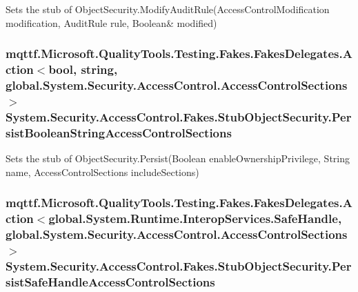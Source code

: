 Sets the stub of Object\-Security.\-Modify\-Audit\-Rule(Access\-Control\-Modification modification, Audit\-Rule rule, Boolean\& modified)

\hypertarget{class_system_1_1_security_1_1_access_control_1_1_fakes_1_1_stub_object_security_a77c7aff6ae7f3250cfdd08a4394b10dd}{
\subsubsection[{Persist\-Boolean\-String\-Access\-Control\-Sections}]{\setlength{\rightskip}{0pt plus 5cm}mqttf.\-Microsoft.\-Quality\-Tools.\-Testing.\-Fakes.\-Fakes\-Delegates.\-Action$<$bool, string, global.\-System.\-Security.\-Access\-Control.\-Access\-Control\-Sections$>$ System.\-Security.\-Access\-Control.\-Fakes.\-Stub\-Object\-Security.\-Persist\-Boolean\-String\-Access\-Control\-Sections}}\label{class_system_1_1_security_1_1_access_control_1_1_fakes_1_1_stub_object_security_a77c7aff6ae7f3250cfdd08a4394b10dd}


Sets the stub of Object\-Security.\-Persist(\-Boolean enable\-Ownership\-Privilege, String name, Access\-Control\-Sections include\-Sections)

\hypertarget{class_system_1_1_security_1_1_access_control_1_1_fakes_1_1_stub_object_security_acc891e4ff132857f01e38e92db6ef082}{
\subsubsection[{Persist\-Safe\-Handle\-Access\-Control\-Sections}]{\setlength{\rightskip}{0pt plus 5cm}mqttf.\-Microsoft.\-Quality\-Tools.\-Testing.\-Fakes.\-Fakes\-Delegates.\-Action$<$global.\-System.\-Runtime.\-Interop\-Services.\-Safe\-Handle, global.\-System.\-Security.\-Access\-Control.\-Access\-Control\-Sections$>$ System.\-Security.\-Access\-Control.\-Fakes.\-Stub\-Object\-Security.\-Persist\-Safe\-Handle\-Access\-Control\-Sections}}\label{class_system_1_1_security_1_1_access_control_1_1_fakes_1_1_stub_object_security_acc891e4ff132857f01e38e92db6ef082}


